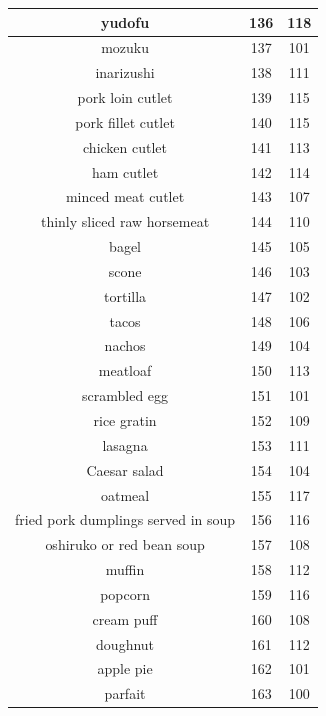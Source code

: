 {\begin{longtable}{| c | c | c|}
        \hline
        yudofu  &  136  &  118  \\
        \hline
        mozuku  &  137  &  101  \\
        \hline
        inarizushi  &  138  &  111  \\
        \hline
        pork loin cutlet  &  139  &  115  \\
        \hline
        pork fillet cutlet  &  140  &  115  \\
        \hline
        chicken cutlet  &  141  &  113  \\
        \hline
        ham cutlet  &  142  &  114  \\
        \hline
        minced meat cutlet  &  143  &  107  \\
        \hline
        thinly sliced raw horsemeat  &  144  &  110  \\
        \hline
        bagel  &  145  &  105  \\
        \hline
        scone  &  146  &  103  \\
        \hline
        tortilla  &  147  &  102  \\
        \hline
        tacos  &  148  &  106  \\
        \hline
        nachos  &  149  &  104  \\
        \hline
        meatloaf  &  150  &  113  \\
        \hline
        scrambled egg  &  151  &  101  \\
        \hline
        rice gratin  &  152  &  109  \\
        \hline
        lasagna  &  153  &  111  \\
        \hline
        Caesar salad  &  154  &  104  \\
        \hline
        oatmeal  &  155  &  117  \\
        \hline
        fried pork dumplings served in soup  &  156  &  116  \\
        \hline
        oshiruko or red bean soup  &  157  &  108  \\
        \hline
        muffin  &  158  &  112  \\
        \hline
        popcorn  &  159  &  116  \\
        \hline
        cream puff  &  160  &  108  \\
        \hline
        doughnut  &  161  &  112  \\
        \hline
        apple pie  &  162  &  101  \\
        \hline
        parfait  &  163  &  100  \\

\end{longtable}}
